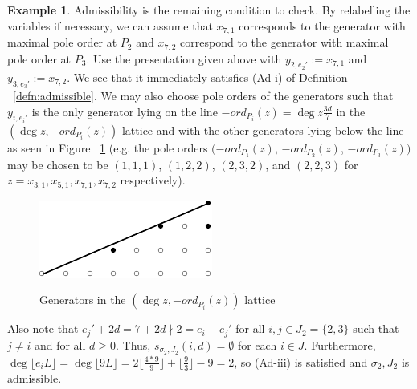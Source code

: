 \documentclass{amsart}
\theoremstyle{plain}
\theoremstyle{definition}
\newtheorem{example}[thm]{Example}
\theoremstyle{remark}
\numberwithin{equation}{section}
\newcommand \halfcan{L}
\begin{document}
\begin{example}


Admissibility is the remaining condition to check. By relabelling the variables if necessary, we can assume
that $x_{7, 1}$ corresponds to the generator with maximal pole order
at $P_2$ and $x_{7, 2}$ correspond to the generator with maximal
pole order at $P_3$.  Use the presentation given
above with $y _{2, e_2'} := x_{7, 1}$ and $y_{3, e_3'} :=  x_{7, 2}$.
We see that it immediately satisfies (Ad-i) of Definition
~\ref{defn:admissible}. We may also choose pole orders of the generators
such that $y_{i, e_i'}$ is the only generator lying on the line
$-ord_{P_i}(z) = \deg z \frac{3d}{7}$ in the $(\deg z, -ord_{P_i}(z))$
 lattice and with the other generators lying below the line as seen
in Figure ~\ref{fig:377} (e.g. the pole orders $(-ord_{P_1}(z)$,
$-ord_{P_2}(z)$, $-ord_{P_3}(z))$ may be chosen to be $(1, 1, 1)$,
$(1, 2, 2)$, $(2, 3, 2)$, and $(2, 2, 3)$ for $z = x_{3, 1}, x_{5, 1},
x_{7, 1}, x_{7, 2}$ respectively).

\begin{figure}[H]
\label{fig:377}
\includegraphics{pics/spin-377-pic-pics.pdf} \\
\caption{Generators in the $(\deg z, -ord_{P_i}(z))$ lattice}
\end{figure}

Also note that $e_j' + 2d = 7 + 2d \nmid 2 = e_i - e_j'$ for all
$i, j \in J_2 = \{2, 3\}$ such that $j \neq i$ and for all $d \geq
0$. Thus, $s_{\sigma_2, J_2}(i, d) = \emptyset$ for each $i \in J$.
Furthermore, $\deg \lfloor e_i \halfcan \rfloor = \deg \lfloor 9
\halfcan \rfloor = 2 \lfloor \frac{4 * 9}{9} \rfloor + \lfloor
\frac{9}{3} \rfloor - 9 = 2$, so (Ad-iii) is satisfied and
$\sigma_2, J_2$ is admissible.
\end{example}
\end{document}
